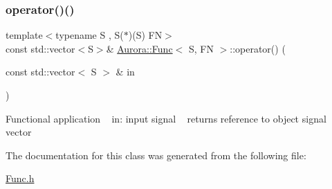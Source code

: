 \subsubsection{\texorpdfstring{operator()()}{operator()()}}
{\footnotesize\ttfamily template$<$typename S , S($\ast$)(\+S) FN$>$ \\
const std\+::vector$<$S$>$\& \hyperlink{class_aurora_1_1_func}{Aurora\+::\+Func}$<$ S, FN $>$\+::operator() (\begin{DoxyParamCaption}\item[{const std\+::vector$<$ S $>$ \&}]{in }\end{DoxyParamCaption})\hspace{0.3cm}{\ttfamily [inline]}}

Functional application ~\newline
in\+: input signal ~\newline
returns reference to object signal vector 

The documentation for this class was generated from the following file\+:\begin{DoxyCompactItemize}
\item 
\hyperlink{_func_8h}{Func.\+h}\end{DoxyCompactItemize}
